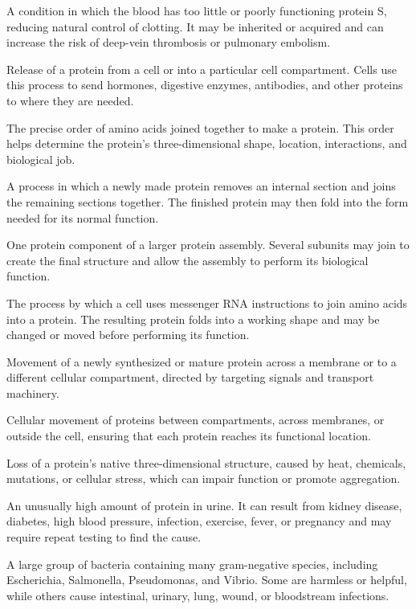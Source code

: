  A condition in which the blood has too little or poorly functioning protein S, reducing natural control of clotting. It may be inherited or acquired and can increase the risk of deep-vein thrombosis or pulmonary embolism.

 Release of a protein from a cell or into a particular cell compartment. Cells use this process to send hormones, digestive enzymes, antibodies, and other proteins to where they are needed.

 The precise order of amino acids joined together to make a protein. This order helps determine the protein’s three-dimensional shape, location, interactions, and biological job.

 A process in which a newly made protein removes an internal section and joins the remaining sections together. The finished protein may then fold into the form needed for its normal function.

 One protein component of a larger protein assembly. Several subunits may join to create the final structure and allow the assembly to perform its biological function.

 The process by which a cell uses messenger RNA instructions to join amino acids into a protein. The resulting protein folds into a working shape and may be changed or moved before performing its function.

 Movement of a newly synthesized or mature protein across a membrane or to a different cellular compartment, directed by targeting signals and transport machinery.

 Cellular movement of proteins between compartments, across membranes, or outside the cell, ensuring that each protein reaches its functional location.

 Loss of a protein’s native three-dimensional structure, caused by heat, chemicals, mutations, or cellular stress, which can impair function or promote aggregation.

 An unusually high amount of protein in urine. It can result from kidney disease, diabetes, high blood pressure, infection, exercise, fever, or pregnancy and may require repeat testing to find the cause.

 A large group of bacteria containing many gram-negative species, including Escherichia, Salmonella, Pseudomonas, and Vibrio. Some are harmless or helpful, while others cause intestinal, urinary, lung, wound, or bloodstream infections.

